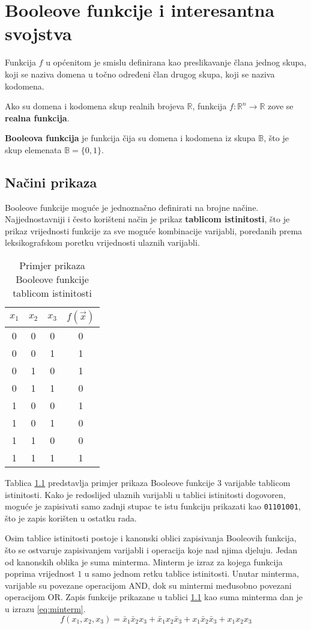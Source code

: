 \chapter{Booleove funkcije i interesantna svojstva}

Funkcija $f$ u općenitom je smislu definirana kao preslikavanje člana jednog skupa, koji se naziva domena u točno određeni član drugog skupa, koji se naziva kodomena.

Ako su domena i kodomena skup realnih brojeva $\mathds{R}$, funkcija $f : \mathds{R}^n \rightarrow \mathds{R}$ zove se \textbf{realna funkcija}.

\textbf{Booleova funkcija} je funkcija čija su domena i kodomena iz skupa $\mathds{B}$, što je skup elemenata $\mathds{B} = \{0, 1\}$.

\section{Načini prikaza}
Booleove funkcije moguće je jednoznačno definirati na brojne načine.
Najjednostavniji i često korišteni način je prikaz \textbf{tablicom istinitosti}, što je prikaz vrijednosti funkcije za sve moguće kombinacije varijabli, poredanih prema leksikografskom poretku vrijednosti ulaznih varijabli. 
\begin{table}
\centering
\caption{Primjer prikaza Booleove funkcije tablicom istinitosti}
\begin{tabular}{ccc|c}
$x_1$ & $x_2$ & $x_3$ & $f(\vec{x})$ \\ \hline
 0 & 0 & 0 & 0 \\
 0 & 0 & 1 & 1 \\
 0 & 1 & 0 & 1 \\
 0 & 1 & 1 & 0 \\
 1 & 0 & 0 & 1 \\
 1 & 0 & 1 & 0 \\
 1 & 1 & 0 & 0 \\
 1 & 1 & 1 & 1
\end{tabular}
\label{tbl:truth_table}
\end{table}
Tablica \ref{tbl:truth_table} predstavlja primjer prikaza Booleove funkcije $3$ varijable tablicom istinitosti.
Kako je redoslijed ulaznih varijabli u tablici istinitosti dogovoren, moguće je zapisivati samo zadnji stupac te istu funkciju prikazati kao \texttt{01101001}, što je zapis korišten u ostatku rada.

Osim tablice istinitosti postoje i kanonski oblici zapisivanja Booleovih funkcija, što se ostvaruje zapisivanjem varijabli i operacija koje nad njima djeluju.
Jedan od kanonskih oblika je suma minterma.
Minterm je izraz za kojega funkcija poprima vrijednost $1$ u samo jednom retku tablice istinitosti.
Unutar minterma, varijable su povezane operacijom AND, dok su mintermi međusobno povezani operacijom OR.
Zapis funkcije prikazane u tablici \ref{tbl:truth_table} kao suma minterma dan je u izrazu \eqref{eq:minterm}.
\begin{equation}\label{eq:minterm}
    f(x_1, x_2, x_3) = \bar{x}_1\bar{x}_2x_3 + \bar{x}_1x_2\bar{x}_3 + x_1\bar{x}_2\bar{x}_3 + x_1x_2x_3
\end{equation}

